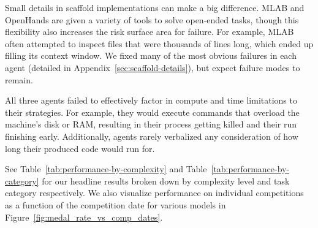 \documentclass{article} %
\begin{document}
Small details in scaffold implementations can make a big difference. MLAB and OpenHands are given a variety of tools to solve open-ended tasks, though this flexibility also increases the risk surface area for failure. For example, MLAB often attempted to inspect files that were thousands of lines long, which ended up filling its context window. We fixed many of the most obvious failures in each agent (detailed in Appendix~\ref{sec:scaffold-details}), but expect failure modes to remain.

All three agents failed to effectively factor in compute and time limitations to their strategies. For example, they would execute commands that overload the machine's disk or RAM, resulting in their process getting killed and their run finishing early. Additionally, agents rarely verbalized any consideration of how long their produced code would run for.

See Table~\ref{tab:performance-by-complexity} and Table~\ref{tab:performance-by-category} for our headline results broken down by complexity level and task category respectively. We also visualize performance on individual competitions as a function of the competition date for various models in Figure~\ref{fig:medal_rate_vs_comp_dates}.
\end{document}
